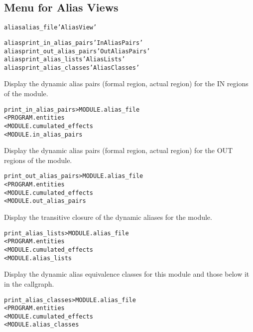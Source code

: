 \documentclass[a4paper]{report}
\newenvironment{PipsMake}{\begin{alltt}}{\end{alltt}}
\newenvironment{PipsPass}[1]{\label{pass:#1}}{}
\begin{document}
\subsection{Menu for Alias Views}

\begin{PipsMake}
alias alias_file 'Alias View'

alias print_in_alias_pairs 'In Alias Pairs'
alias print_out_alias_pairs 'Out Alias Pairs'
alias print_alias_lists 'Alias Lists'
alias print_alias_classes 'Alias Classes'
\end{PipsMake}

\begin{PipsPass}{print_in_alias_pairs}
Display the dynamic alias pairs (formal region, actual region) for the IN
regions of the module.
\end{PipsPass}
\begin{PipsMake}
print_in_alias_pairs > MODULE.alias_file
        < PROGRAM.entities
        < MODULE.cumulated_effects
        < MODULE.in_alias_pairs
\end{PipsMake}

\begin{PipsPass}{print_out_alias_pairs}
Display the dynamic alias pairs (formal region, actual region) for the OUT
regions of the module.
\end{PipsPass}
\begin{PipsMake}
print_out_alias_pairs > MODULE.alias_file
        < PROGRAM.entities
        < MODULE.cumulated_effects
        < MODULE.out_alias_pairs
\end{PipsMake}

\begin{PipsPass}{print_alias_lists}
Display the transitive closure of the dynamic aliases for the module.
\end{PipsPass}
\begin{PipsMake}
print_alias_lists > MODULE.alias_file
        < PROGRAM.entities
        < MODULE.cumulated_effects
        < MODULE.alias_lists
\end{PipsMake}

\begin{PipsPass}{print_alias_classes}
Display the dynamic alias equivalence classes for this module and those
below it in the callgraph.
\end{PipsPass}
\begin{PipsMake}
print_alias_classes > MODULE.alias_file
        < PROGRAM.entities
        < MODULE.cumulated_effects
        < MODULE.alias_classes
\end{PipsMake}
\end{document}
